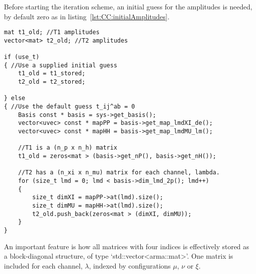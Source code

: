 Before starting the iteration scheme, an initial guess for the amplitudes is needed, by default zero as in listing~\ref{lst:CC:initialAmplitudes}.
\begin{lstlisting}[float,label=lst:CC:initialAmplitudes,caption={An initial guess for the amplitudes is needed before doing iterations. By default all amplitudes are zero, unless another starting point is supplied in `t1\_stored' and `t2\_stored' at the same time as the switch `use\_t' is set to true. Amplitudes, $t_{ij}^{ab}$, are stored as one matrix for each channel, $\lambda$, $\left.t_{(\lambda)}\right._{\mu}^{\xi}$.\vspace{2mm}}]
mat t1_old; //T1 amplitudes
vector<mat> t2_old; //T2 amplitudes

if (use_t)
{ //Use a supplied initial guess
	t1_old = t1_stored;
    t2_old = t2_stored;
    
} else
{ //Use the default guess t_ij^ab = 0    
	Basis const * basis = sys->get_basis();
    vector<uvec> const * mapPP = basis->get_map_lmdXI_de();
    vector<uvec> const * mapHH = basis->get_map_lmdMU_lm();
    
    //T1 is a (n_p x n_h) matrix
    t1_old = zeros<mat > (basis->get_nP(), basis->get_nH());
    
    //T2 has a (n_xi x n_mu) matrix for each channel, lambda.
    for (size_t lmd = 0; lmd < basis->dim_lmd_2p(); lmd++)
    {
    	size_t dimXI = mapPP->at(lmd).size();
        size_t dimMU = mapHH->at(lmd).size();
        t2_old.push_back(zeros<mat > (dimXI, dimMU));
	}
}
\end{lstlisting}
An important feature is how all matrices with four indices is effectively stored as a block-diagonal structure, of type `std::vector\textless arma::mat\textgreater'.
One matrix is included for each channel, $\lambda$, indexed by configurations $\mu$, $\nu$ or $\xi$.


